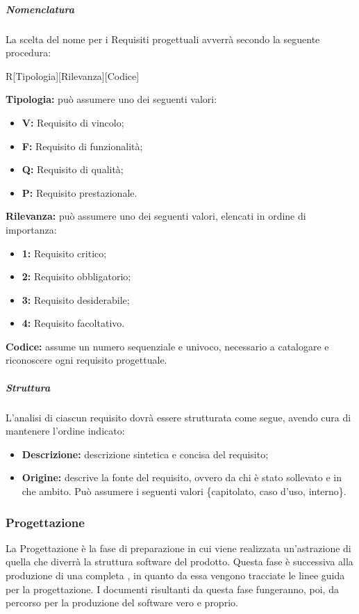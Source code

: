 			\subparagraph{Nomenclatura}
			La scelta del nome per i Requisiti progettuali avverrà secondo la seguente procedura:
			\begin{center}
			R[Tipologia][Rilevanza][Codice]
			\end{center}
			\textbf{Tipologia:} può assumere uno dei seguenti valori:
			\begin{itemize}
				\item \textbf{V:} Requisito di vincolo;
				\item \textbf{F:} Requisito di funzionalità;
				\item \textbf{Q:} Requisito di qualità;
				\item \textbf{P:} Requisito prestazionale.
			\end{itemize}
			\textbf{Rilevanza:} può assumere uno dei seguenti valori, elencati in ordine di importanza:
			\begin{itemize}
				\item \textbf{1:} Requisito critico;
				\item \textbf{2:} Requisito obbligatorio;
				\item \textbf{3:} Requisito desiderabile;
				\item \textbf{4:} Requisito facoltativo.
			\end{itemize}
			\textbf{Codice:} assume un numero sequenziale e univoco, necessario a catalogare e riconoscere ogni requisito progettuale.
		
			\subparagraph{Struttura}
			L'analisi di ciascun requisito dovrà essere strutturata come segue, avendo cura di mantenere l'ordine indicato:
			\begin{itemize}
			  \item \textbf{Descrizione:} descrizione sintetica e concisa del requisito;
			  \item \textbf{Origine:} descrive la fonte del requisito, ovvero da chi è stato sollevato e in che ambito. Può assumere i seguenti valori \{capitolato, caso d'uso, interno\}.
			\end{itemize}
	
	\subsubsection{Progettazione}
	La Progettazione è la fase di preparazione in cui viene realizzata un'astrazione di quella che diverrà la struttura software del prodotto. Questa fase è successiva alla produzione di una completa \AdR, in quanto da essa vengono tracciate le linee guida per la progettazione. I documenti risultanti da questa fase fungeranno, poi, da percorso per la produzione del software vero e proprio.
	
